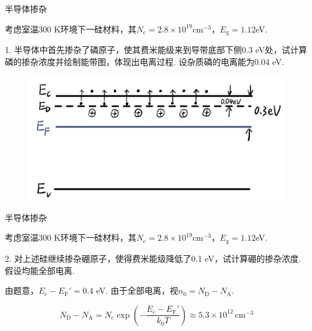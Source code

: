\documentclass{beamer}
\begin{document}
\begin{frame}[t]{半导体掺杂}

    {\kaishu
        \qquad 考虑室温300 K环境下一硅材料，其$N_{\text{c}}=2.8\times 10^{19}$cm$^{-3}$，$E_\text{{g}} = 1.12$eV.\par
        1. 半导体中首先掺杂了磷原子，使其费米能级来到导带底部下侧0.3 eV处，试计算磷的掺杂浓度并绘制能带图，体现出电离过程. 设杂质磷的电离能为0.04 eV.\par
    }
    \vspace{-0.3cm}
    \begin{figure}
        \centering
        \includegraphics[width=0.75\linewidth]{6.jpg}
    \end{figure}
\end{frame}

\begin{frame}[t]{半导体掺杂}

    {\kaishu
        \qquad 考虑室温300 K环境下一硅材料，其$N_{\text{c}}=2.8\times 10^{19}$cm$^{-3}$，$E_\text{{g}} = 1.12$eV.\par
        2. 对上述硅继续掺杂硼原子，使得费米能级降低了0.1 eV，试计算硼的掺杂浓度. 假设均能全部电离.\par
    }
    \vspace{0.1cm}
    \qquad 由题意，$E_{\text{c}}-E_{\text{F}}'=0.4$ eV. 由于全部电离，视$n_0 = N_{\text{D}} - N_{\text{A}} $.\par
    \vspace{-0.2cm}
    \[
        N_{\text{D}} - N_{\text{A}} = N_{\text{c}} \exp ( - \frac{E_{\text{c}}-E_{\text{F}}'}{k_0 T} ) \approx 5.3\times 10^{12} \, \text{cm}^{-3}  
    \]
\end{frame}
\end{document}
